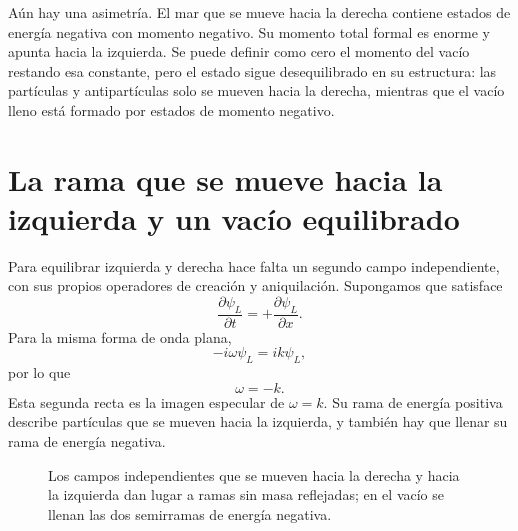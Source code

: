 Aún hay una asimetría. El mar que se mueve hacia la derecha contiene estados de energía negativa con momento negativo. Su momento total formal es enorme y apunta hacia la izquierda. Se puede definir como cero el momento del vacío restando esa constante, pero el estado sigue desequilibrado en su estructura: las partículas y antipartículas solo se mueven hacia la derecha, mientras que el vacío lleno está formado por estados de momento negativo.

\section{La rama que se mueve hacia la izquierda y un vacío equilibrado}

Para equilibrar izquierda y derecha hace falta un segundo campo independiente, con sus propios operadores de creación y aniquilación. Supongamos que satisface
\begin{equation}
\frac{\partial\psi_L}{\partial t}
=
+\frac{\partial\psi_L}{\partial x}.
\end{equation}
Para la misma forma de onda plana,
\begin{equation}
-i\omega\psi_L=ik\psi_L,
\end{equation}
por lo que
\begin{equation}
\omega=-k.
\end{equation}
Esta segunda recta es la imagen especular de \(\omega=k\). Su rama de energía positiva describe partículas que se mueven hacia la izquierda, y también hay que llenar su rama de energía negativa.

\begin{figure}[htbp]
\centering
{}
\caption{Los campos independientes que se mueven hacia la derecha y hacia la izquierda dan lugar a ramas sin masa reflejadas; en el vacío se llenan las dos semirramas de energía negativa.}
\end{figure}


